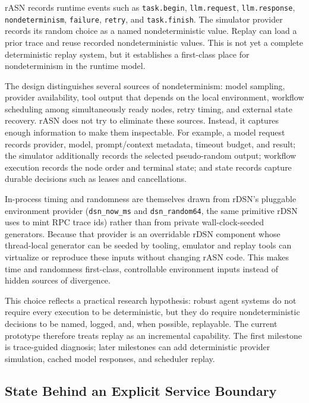 \documentclass[manuscript,screen,review]{acmart}
\newcommand{\rasn}{rASN\xspace}
\begin{document}
\rasn records runtime events such as \texttt{task.begin},
\texttt{llm.request}, \texttt{llm.response}, \texttt{nondeterminism},
\texttt{failure}, \texttt{retry}, and \texttt{task.finish}. The simulator
provider records its random choice as a named nondeterministic value. Replay can
load a prior trace and reuse recorded nondeterministic values. This is not yet a
complete deterministic replay system, but it establishes a first-class place
for nondeterminism in the runtime model.

The design distinguishes several sources of nondeterminism: model sampling,
provider availability, tool output that depends on the local environment,
workflow scheduling among simultaneously ready nodes, retry timing, and external
state recovery. \rasn does not try to eliminate these sources. Instead, it
captures enough information to make them inspectable. For example, a model
request records provider, model, prompt/context metadata, timeout budget, and
result; the simulator additionally records the selected pseudo-random output;
workflow execution records the node order and terminal state; and state records
capture durable decisions such as leases and cancellations.

In-process timing and randomness are themselves drawn from rDSN's pluggable
environment provider (\texttt{dsn\_now\_ms} and \texttt{dsn\_random64}, the same
primitive rDSN uses to mint RPC trace ids) rather than from private
wall-clock-seeded generators. Because that provider is an overridable rDSN
component whose thread-local generator can be seeded by tooling, emulator and
replay tools can virtualize or reproduce these inputs without changing \rasn
code. This makes time and randomness first-class, controllable environment
inputs instead of hidden sources of divergence.

This choice reflects a practical research hypothesis: robust agent systems do
not require every execution to be deterministic, but they do require
nondeterministic decisions to be named, logged, and, when possible, replayable.
The current prototype therefore treats replay as an incremental capability. The
first milestone is trace-guided diagnosis; later milestones can add
deterministic provider simulation, cached model responses, and scheduler replay.

\subsection{State Behind an Explicit Service Boundary}
\end{document}
